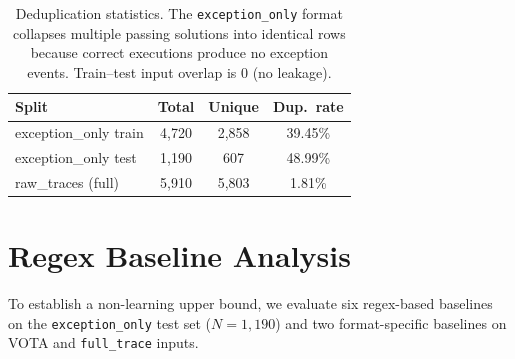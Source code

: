 \begin{table}[t]
\centering
\caption{Deduplication statistics. The \texttt{exception\_only} format collapses multiple passing solutions into identical rows because correct executions produce no exception events. Train--test input overlap is 0 (no leakage).}
\label{tab:dedup}
\small
\begin{tabular}{lccc}
\toprule
\textbf{Split} & \textbf{Total} & \textbf{Unique} & \textbf{Dup.\ rate} \\
\midrule
exception\_only train & 4{,}720 & 2{,}858 & 39.45\% \\
exception\_only test  & 1{,}190 &   607 & 48.99\% \\
raw\_traces (full)    & 5{,}910 & 5{,}803 &  1.81\% \\
\bottomrule
\end{tabular}
\end{table}

\section{Regex Baseline Analysis}
\label{sec:regex_baselines}

To establish a non-learning upper bound, we evaluate six regex-based baselines on the \texttt{exception\_only} test set ($N{=}1{,}190$) and two format-specific baselines on VOTA and \texttt{full\_trace} inputs.

\begin{table}[t]
\centering
\caption{Regex baseline accuracy ($N{=}1{,}190$). B4 is the strongest semantic baseline (6.22pp below SFT \texttt{exception\_only}, McNemar $p{<}.001$). B6 uses an error count threshold. $^\ddag$B5 exploits a data formatting artifact: the \texttt{[No exception data in trace]} marker is deterministically present in all pass samples, making this a format-level shortcut rather than a genuine exception-based heuristic.}
\label{tab:regex}
\small
{}
\end{table}

